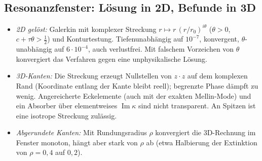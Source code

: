 \documentclass[11pt, a4paper]{article}
\newcommand{\st}[1]{{\small\sffamily[#1]}}
\begin{document}
\subsection{Resonanzfenster: Lösung in 2D, Befunde in 3D}
\begin{itemize}[leftmargin=*]
  \item \emph{2D gelöst:} Galerkin mit komplexer Streckung $r\mapsto r\,(r/r_0)^{i\theta}$ ($\theta>0$,
    $c+\tau\theta>\tfrac12$) und Konturtestung. Tiefenunabhängig auf $10^{-7}$, konvergent, $\theta$-unabhängig
    auf $6\cdot10^{-4}$, auch verlustfrei. Mit falschem Vorzeichen von $\theta$ konvergiert das Verfahren gegen eine
    unphysikalische Lösung. \st{numerisch}
  \item \emph{3D-Kanten:} Die Streckung erzeugt Nullstellen von $z\cdot z$ auf dem komplexen Rand (Koordinate
    entlang der Kante bleibt reell); begrenzte Phase dämpft zu wenig. Angereicherte Eckelemente (auch mit der
    exakten Mellin-Mode) und ein Absorber über elementweises $\operatorname{Im}\kappa$ sind nicht transparent.
    An Spitzen ist eine isotrope Streckung zulässig. \st{numerisch}
  \item \emph{Abgerundete Kanten:} Mit Rundungsradius $\rho$ konvergiert die 3D-Rechnung im Fenster monoton, hängt
    aber stark von $\rho$ ab (etwa Halbierung der Extinktion von $\rho=0{,}4$ auf $0{,}2$). \st{numerisch}
\end{itemize}

\end{document}

